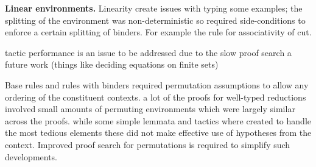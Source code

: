 \textbf{Linear environments.} Linearity create issues with typing some
examples; the splitting of the environment was non-deterministic so required
side-conditions to enforce a certain splitting of binders. For example the
rule for associativity of cut. 

tactic performance is an issue to be addressed due to the slow proof search a
future work (things like deciding equations on finite sets)

Base rules and rules with binders required permutation assumptions to allow
any ordering of the constituent contexts. a lot of the proofs for well-typed
reductions involved small amounts of permuting environments which were largely
similar across the proofs. while some simple lemmata and tactics where created
to handle the most tedious elements these did not make effective use of
hypotheses from the context. Improved proof search for permutations is
required to simplify such developments.
